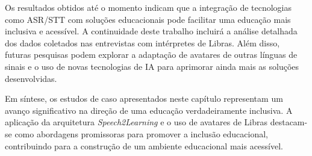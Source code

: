 Os resultados obtidos até o momento indicam que a integração de tecnologias como ASR/STT com soluções educacionais pode facilitar uma educação mais inclusiva e acessível. A continuidade deste trabalho incluirá a análise detalhada dos dados coletados nas entrevistas com intérpretes de Libras. Além disso, futuras pesquisas podem explorar a adaptação de avatares de outras línguas de sinais e o uso de novas tecnologias de IA para aprimorar ainda mais as soluções desenvolvidas.

Em síntese, os estudos de caso apresentados neste capítulo representam um avanço significativo na direção de uma educação verdadeiramente inclusiva. A aplicação da arquitetura \textit{Speech2Learning} e o uso de avatares de Libras destacam-se como abordagens promissoras para promover a inclusão educacional, contribuindo para a construção de um ambiente educacional mais acessível.
